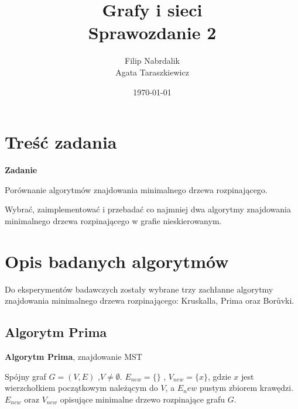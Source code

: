 \documentclass[a4paper, 10pt]{article}
\title{{\bf {Grafy i sieci}} \\ {\large Sprawozdanie 2}}
\date{\today}
\author{Filip Nabrdalik \\Agata Taraszkiewicz}
\begin{document}


\maketitle 




\newcommand{\ang}[1]{(ang. {\em #1}\/)}
\newcommand{\e}[1]{{\em #1}\/}





\section{Treść zadania}

{\bf{Zadanie}}

Porównanie algorytmów znajdowania minimalnego drzewa rozpinającego.

Wybrać, zaimplementować i przebadać co najmniej dwa algorytmy znajdowania minimalnego drzewa rozpinającego w grafie nieskierowanym. 

 

\section{Opis badanych algorytmów}

Do eksperymentów badawczych zostały wybrane trzy zachłanne algorytmy znajdowania minimalnego drzewa rozpinającego: Kruskalla, Prima oraz
Borůvki.

	\subsection{Algorytm Prima}

\begin{algorithm}
\caption{{\bf Algorytm Prima}, znajdowanie MST}
\begin{algorithmic}[!h]
\REQUIRE Spójny graf $G=(V,E)$ ,$V \neq \emptyset$. 
\ENSURE $E_{new}=\{\}$ , $V_{new}=\{x\}$, gdzie $x$ jest wierzchołkiem początkowym należącym do $V$, a $E_new$ pustym zbiorem krawędzi.
\STATE {}
\STATE {}   
\ENDWHILE
\RETURN $E_{new}$ oraz $V_{new}$ opisujące minimalne drzewo rozpinające grafu $G$. 
\end{algorithmic}
\end{algorithm}	
\end{document}
